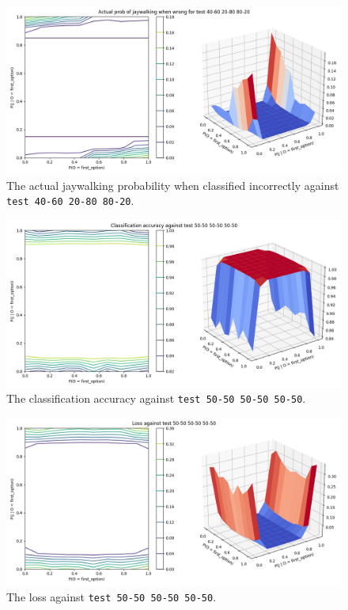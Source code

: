 \documentclass{report}
\newcommand{\code}{\texttt}
\begin{document}
\begin{figure}[h]
    \centering
    \includegraphics[width=\textwidth]{test_40-60_20-80_80-20_jay_prob.png}
    \caption[]{The actual jaywalking probability when classified incorrectly against \code{test 40-60 20-80 80-20}.}
    \label{fig:test_40-60_20-80_80-20_jay_prob_plot}
\end{figure}

% 
% 

\begin{figure}[h]
    \centering
    \includegraphics[width=\textwidth]{test_50-50_50-50_50-50_accuracy.png}
    \caption[]{The classification accuracy against \code{test 50-50 50-50 50-50}.}
    \label{fig:test_50-50_50-50_50-50_accuracy_plot}
\end{figure}

\begin{figure}[h]
    \centering
    \includegraphics[width=\textwidth]{test_50-50_50-50_50-50_loss.png}
    \caption[]{The loss against \code{test 50-50 50-50 50-50}.}
    \label{fig:test_50-50_50-50_50-50_loss_plot}
\end{figure}
\end{document}
